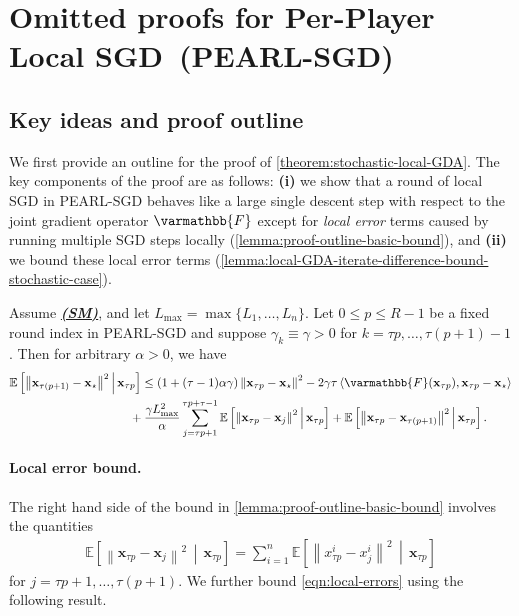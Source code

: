 \documentclass{article}
\newcommand{\algname}[1]{{\color{PineGreen}\sf  #1}\xspace}
\newcommand{\vx}{{\mathbf{x}}}
\newcommand{\opF}{{\varmathbb{F}}}
\newcommand{\inprod}[2]{\left\langle #1,#2 \right\rangle}
\newcommand{\sqnorm}[1]{\left\| #1 \right\|^2}
\newcommand{\fullname}{Per-Player Local SGD}
\newcommand{\abbvname}{\algname{PEARL-SGD}}
\theoremstyle{plain}
\theoremstyle{remark}
\begin{document}
\newpage

\section{Omitted proofs for \fullname~(\abbvname)}
\label{section:omitted_proofs_playerwise_local_gradient}

\subsection{Key ideas and proof outline}
\label{subsection:plog-proof-outline}

We first provide an outline for the proof of \cref{theorem:stochastic-local-GDA}.
The key components of the proof are as follows:
\textbf{(i)} we show that a round of local SGD in \abbvname behaves like a large single descent step with respect to the joint gradient operator $\opF$ except for \emph{local error} terms caused by running multiple SGD steps locally (\cref{lemma:proof-outline-basic-bound}), and \textbf{(ii)} we bound these local error terms (\cref{lemma:local-GDA-iterate-difference-bound-stochastic-case}).

\begin{lemma}
\label{lemma:proof-outline-basic-bound}
Assume \hyperref[assumption:smoothness]{\textbf{\emph{(SM)}}}, and let $L_{\mathrm{max}} = \max\{L_1,\dots,L_n\}$.
Let $0 \le p \le R-1$ be a fixed round index in \abbvname and suppose $\gamma_k \equiv \gamma > 0$ for $k=\tau p, \dots, \tau(p+1) - 1$.
Then for arbitrary $\alpha > 0$, we have
\begin{align*}
\textstyle
    & \mathbb{E} \left[\sqnorm{\vx_{\tau (p+1)} - \vx_\star} \,\middle|\, \vx_{\tau p} \right] \le (1 + (\tau -1)\alpha\gamma) \sqnorm{\vx_{\tau p} - \vx_\star} - 2\gamma\tau \inprod{\opF(\vx_{\tau p})}{\vx_{\tau p} - \vx_\star} \\
    & \qquad \qquad \qquad \qquad \qquad + \frac{\gamma L_{\mathrm{max}}^2}{\alpha} \sum_{j=\tau p+1}^{\tau p+\tau-1} \mathbb{E} \left[ \sqnorm{\vx_{\tau p} - \vx_{j}} \,\middle|\, \vx_{\tau p} \right] + \mathbb{E} \left[ \sqnorm{\vx_{\tau p} - \vx_{\tau (p+1)}} \,\middle|\, \vx_{\tau p} \right] .
\end{align*}
\end{lemma}

\paragraph{Local error bound.}
The right hand side of the bound in \cref{lemma:proof-outline-basic-bound} involves the quantities
\begin{align}
\label{eqn:local-errors}
    \mathbb{E} \left[ \sqnorm{\vx_{\tau p} - \vx_{j}} \,\middle|\, \vx_{\tau p} \right] = \sum_{i=1}^n \mathbb{E} \left[ \sqnorm{x_{\tau p}^i - x_j^i} \,\middle|\, \vx_{\tau p} \right]
\end{align}
for $j=\tau p+1, \dots, \tau (p+1)$.
We further bound \eqref{eqn:local-errors} using the following result.
\end{document}
